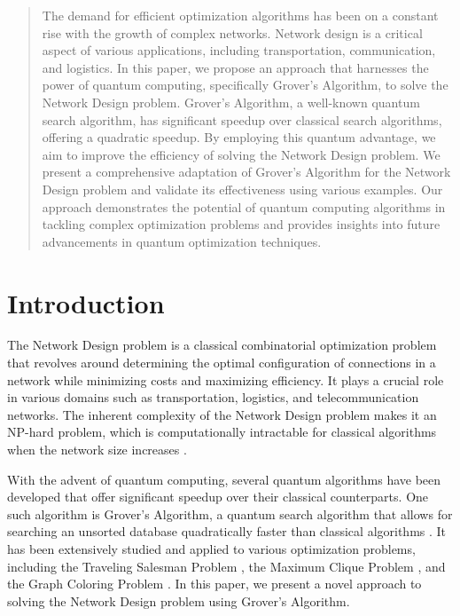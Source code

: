 
\begin{abstract}
The demand for efficient optimization algorithms has been on a constant rise with the growth of complex networks. Network design is a critical aspect of various applications, including transportation, communication, and logistics. In this paper, we propose an approach that harnesses the power of quantum computing, specifically Grover's Algorithm, to solve the Network Design problem. Grover's Algorithm, a well-known quantum search algorithm, has significant speedup over classical search algorithms, offering a quadratic speedup. By employing this quantum advantage, we aim to improve the efficiency of solving the Network Design problem. We present a comprehensive adaptation of Grover's Algorithm for the Network Design problem and validate its effectiveness using various examples. Our approach demonstrates the potential of quantum computing algorithms in tackling complex optimization problems and provides insights into future advancements in quantum optimization techniques.
\end{abstract}

\section{Introduction}

The Network Design problem is a classical combinatorial optimization problem that revolves around determining the optimal configuration of connections in a network while minimizing costs and maximizing efficiency. It plays a crucial role in various domains such as transportation, logistics, and telecommunication networks. The inherent complexity of the Network Design problem makes it an NP-hard problem, which is computationally intractable for classical algorithms when the network size increases \cite{garey1979computers}.

With the advent of quantum computing, several quantum algorithms have been developed that offer significant speedup over their classical counterparts. One such algorithm is Grover's Algorithm, a quantum search algorithm that allows for searching an unsorted database quadratically faster than classical algorithms \cite{grover1996fast}. It has been extensively studied and applied to various optimization problems, including the Traveling Salesman Problem \cite{zhang2006quantum}, the Maximum Clique Problem \cite{childs2007quantum}, and the Graph Coloring Problem \cite{shukla2020quantum}. In this paper, we present a novel approach to solving the Network Design problem using Grover's Algorithm.

